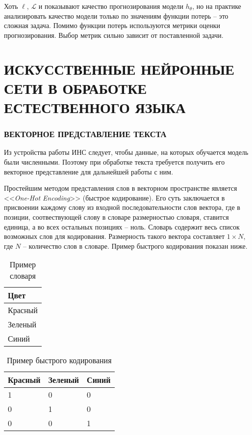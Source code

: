 Хоть $\ell$, $\mathcal{L}$ и показывают качество прогнозирования модели $h_{\theta}$, но на практике анализировать качество модели только по значениям функции потерь -- это сложная задача. Помимо функции потерь используются метрики оценки прогнозирования. Выбор метрик сильно зависит от поставленной задачи.

\section{ИСКУССТВЕННЫЕ НЕЙРОННЫЕ СЕТИ В ОБРАБОТКЕ ЕСТЕСТВЕННОГО ЯЗЫКА}
\subsubsection{ВЕКТОРНОЕ ПРЕДСТАВЛЕНИЕ ТЕКСТА}
Из устройства работы ИНС следует, чтобы данные, на которых обучается модель были численными. Поэтому при обработке текста требуется получить его векторное представление для дальнейшей работы с ним.

Простейшим методом представления слов в векторном пространстве является <<\textit{One-Hot Encoding}>> (быстрое кодирование). Его суть заключается в присвоении каждому слову из входной последовательности слов вектора, где в позиции, соотвествующей слову в словаре размерностью словаря, ставится единица, а во всех остальных позициях -- ноль. Словарь содержит весь список возможных слов для кодирования. Размерность такого вектора составляет $1 \times N$, где $N$ -- количество слов в словаре. Пример быстрого кодирования показан ниже.

\begin{table}[H]
    \captionsetup{format=hang, singlelinecheck=false}
    \raggedleft
    \caption{Пример словаря}
    \label{tab:dict}
    \centering
    \begin{tabular}{|p{5cm}|}
        \hline
        \textbf{Цвет} \\
        \hline
        Красный       \\
        \hline
        Зеленый       \\
        \hline
        Синий         \\
        \hline
    \end{tabular}
\end{table}

\begin{table}[H]
    \captionsetup{format=hang, singlelinecheck=false}
    \raggedleft
    \caption{Пример быстрого кодирования}
    \label{tab:ohe}
    \centering
    \begin{tabular}{|p{5cm}|p{5cm}|p{5cm}|}
        \hline
        \textbf{Красный} & \textbf{Зеленый} & \textbf{Синий} \\
        \hline
        1                & 0                & 0              \\
        \hline
        0                & 1                & 0              \\
        \hline
        0                & 0                & 1              \\
        \hline
    \end{tabular}
\end{table}

